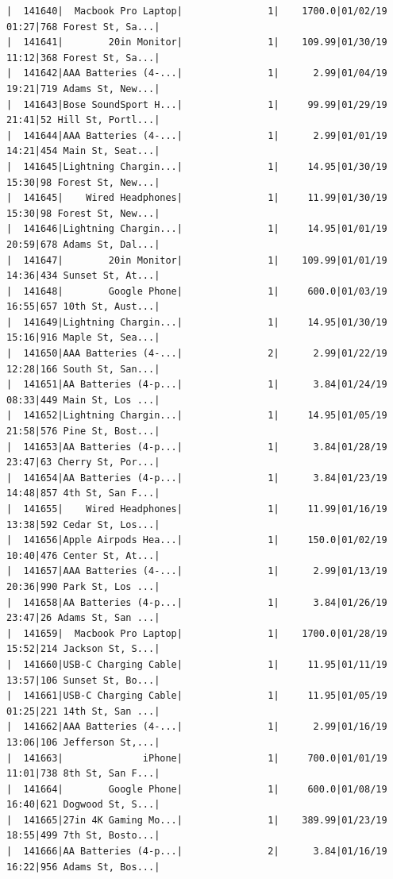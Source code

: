 \documentclass[
  letterpaper,
  DIV=11,
  numbers=noendperiod]{scrartcl}
\begin{document}
\begin{verbatim}
|  141640|  Macbook Pro Laptop|               1|    1700.0|01/02/19 01:27|768 Forest St, Sa...|
|  141641|        20in Monitor|               1|    109.99|01/30/19 11:12|368 Forest St, Sa...|
|  141642|AAA Batteries (4-...|               1|      2.99|01/04/19 19:21|719 Adams St, New...|
|  141643|Bose SoundSport H...|               1|     99.99|01/29/19 21:41|52 Hill St, Portl...|
|  141644|AAA Batteries (4-...|               1|      2.99|01/01/19 14:21|454 Main St, Seat...|
|  141645|Lightning Chargin...|               1|     14.95|01/30/19 15:30|98 Forest St, New...|
|  141645|    Wired Headphones|               1|     11.99|01/30/19 15:30|98 Forest St, New...|
|  141646|Lightning Chargin...|               1|     14.95|01/01/19 20:59|678 Adams St, Dal...|
|  141647|        20in Monitor|               1|    109.99|01/01/19 14:36|434 Sunset St, At...|
|  141648|        Google Phone|               1|     600.0|01/03/19 16:55|657 10th St, Aust...|
|  141649|Lightning Chargin...|               1|     14.95|01/30/19 15:16|916 Maple St, Sea...|
|  141650|AAA Batteries (4-...|               2|      2.99|01/22/19 12:28|166 South St, San...|
|  141651|AA Batteries (4-p...|               1|      3.84|01/24/19 08:33|449 Main St, Los ...|
|  141652|Lightning Chargin...|               1|     14.95|01/05/19 21:58|576 Pine St, Bost...|
|  141653|AA Batteries (4-p...|               1|      3.84|01/28/19 23:47|63 Cherry St, Por...|
|  141654|AA Batteries (4-p...|               1|      3.84|01/23/19 14:48|857 4th St, San F...|
|  141655|    Wired Headphones|               1|     11.99|01/16/19 13:38|592 Cedar St, Los...|
|  141656|Apple Airpods Hea...|               1|     150.0|01/02/19 10:40|476 Center St, At...|
|  141657|AAA Batteries (4-...|               1|      2.99|01/13/19 20:36|990 Park St, Los ...|
|  141658|AA Batteries (4-p...|               1|      3.84|01/26/19 23:47|26 Adams St, San ...|
|  141659|  Macbook Pro Laptop|               1|    1700.0|01/28/19 15:52|214 Jackson St, S...|
|  141660|USB-C Charging Cable|               1|     11.95|01/11/19 13:57|106 Sunset St, Bo...|
|  141661|USB-C Charging Cable|               1|     11.95|01/05/19 01:25|221 14th St, San ...|
|  141662|AAA Batteries (4-...|               1|      2.99|01/16/19 13:06|106 Jefferson St,...|
|  141663|              iPhone|               1|     700.0|01/01/19 11:01|738 8th St, San F...|
|  141664|        Google Phone|               1|     600.0|01/08/19 16:40|621 Dogwood St, S...|
|  141665|27in 4K Gaming Mo...|               1|    389.99|01/23/19 18:55|499 7th St, Bosto...|
|  141666|AA Batteries (4-p...|               2|      3.84|01/16/19 16:22|956 Adams St, Bos...|

\end{verbatim}
\end{document}
